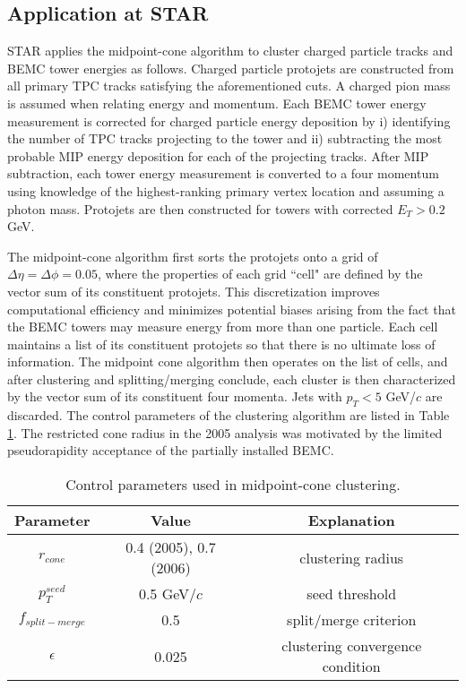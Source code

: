 \subsection{Application at STAR}

STAR applies the midpoint-cone algorithm to cluster charged particle tracks
and BEMC tower energies as follows. Charged particle protojets are constructed
from all primary TPC tracks satisfying the aforementioned cuts. A charged pion
mass is assumed when relating energy and momentum. Each BEMC tower energy
measurement is corrected for charged particle energy deposition by i)
identifying the number of TPC tracks projecting to the tower and ii)
subtracting the most probable MIP energy deposition for each of the projecting
tracks. After MIP subtraction, each tower energy measurement is converted to a
four momentum using knowledge of the highest-ranking primary vertex location
and assuming a photon mass. Protojets are then constructed for towers with
corrected $E_{T}>0.2 $GeV.

The midpoint-cone algorithm first sorts the protojets onto a grid of
$\Delta\eta=\Delta\phi=0.05$, where the properties of each grid ``cell" are
defined by the vector sum of its constituent protojets. This discretization
improves computational efficiency and minimizes potential biases arising from
the fact that the BEMC towers may measure energy from more than one particle.
Each cell maintains a list of its constituent protojets so that there is no
ultimate loss of information. The midpoint cone algorithm then operates on the
list of cells, and after clustering and splitting/merging conclude, each
cluster is then characterized by the vector sum of its constituent four
momenta. Jets with $p_{T}<5$ GeV/$c$ are discarded. The control parameters of
the clustering algorithm are listed in Table \ref{tbl:jetfinding-parameters}.
The restricted cone radius in the 2005 analysis was motivated by the limited
pseudorapidity acceptance of the partially installed BEMC.

\begin{table}
  \begin{center}
      \begin{tabular}{c|c|c}
      Parameter & Value & Explanation\\
      \hline \hline
      $r_{cone}$  &   0.4 (2005), 0.7 (2006) & clustering radius \\ \hline
      $p_{T}^{seed}$  &   0.5 GeV/$c$ & seed threshold \\ \hline
      $f_{split-merge}$  &  0.5  & split/merge criterion \\ \hline
      $\epsilon$  &  0.025  & clustering convergence condition \\
      \end{tabular}
  \end{center}
  \caption{Control parameters used in midpoint-cone clustering.}
  \label{tbl:jetfinding-parameters}
\end{table}
